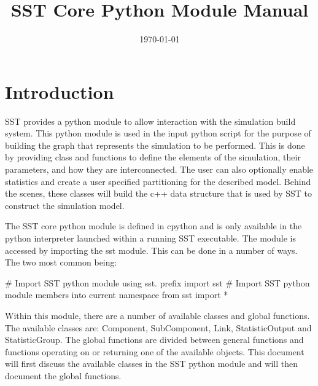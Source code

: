 \documentclass[11pt,letterpaper]{report}
\title{SST Core Python Module Manual}
\date{\today}
\begin{document}
\maketitle
\newpage


\begingroup
  \hypersetup{hidelinks}
  \tableofcontents
\endgroup
\newpage
{}

\chapter{Introduction}

SST provides a python module to allow interaction with the simulation
build system.  This python module is used in the input python script
for the purpose of building the graph that represents the simulation
to be performed.  This is done by providing class and functions to
define the elements of the simulation, their parameters, and how they
are interconnected.  The user can also optionally enable statistics
and create a user specified partitioning for the described model.
Behind the scenes, these classes will build the c++ data structure
that is used by SST to construct the simulation model.

The SST core python module is defined in cpython and is only
available in the python interpreter launched within a running SST
executable.  The module is accessed by importing the sst module.  This
can be done in a number of ways.  The two most common being:

\begin{pycodeexample}{}
# Import SST python module using sst. prefix
import sst
# Import SST python module members into current namespace
from sst import *
\end{pycodeexample}

Within this module, there are a number of available classes and global
functions.  The available classes are: Component, SubComponent, Link,
StatisticOutput and StatisticGroup.  The global functions are divided
between general functions and functions operating on or returning one
of the available objects.  This document will first discuss the
available classes in the SST python module and will then document the
global functions.





\end{document}
